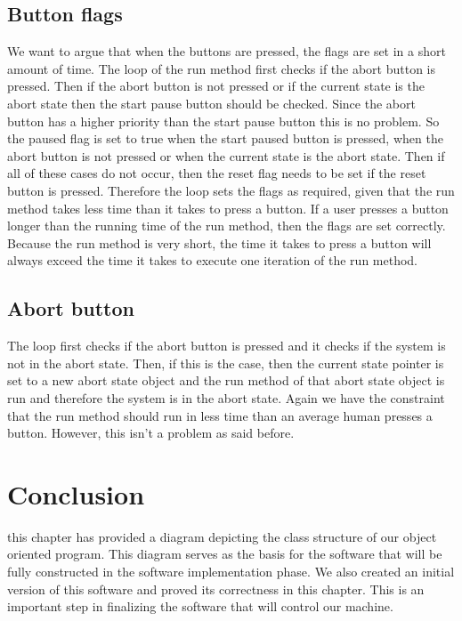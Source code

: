 \documentclass[a4paper,oneside,11pt]{article}
\begin{document}
\subsection{Button flags}
We want to argue that when the buttons are pressed, the flags are set in a short amount of time. The loop of the run method first checks if the abort button is pressed. Then if the abort button is not pressed or if the current state is the abort state then the start pause button should be checked. Since the abort button has a higher priority than the start pause button this is no problem. So the paused flag is set to true when the start paused button is pressed, when the abort button is not pressed or when the current state is the abort state. Then if all of these cases do not occur, then the reset flag needs to be set if the reset button is pressed. Therefore the loop sets the flags as required, given that the run method takes less time than it takes to press a button. If a user presses a button longer than the running time of the run method, then the flags are set correctly. Because the run method is very short, the time it takes to press a button will always exceed the time it takes to execute one iteration of the run method.

\subsection{Abort button}
The loop first checks if the abort button is pressed and it checks if the system is not in the abort state. Then, if this is the case, then the current state pointer is set to a new abort state object and the run method of that abort state object is run and therefore the system is in the abort state. Again we have the constraint that the run method should run in less time than an average human presses a button. However, this isn’t a problem as said before.

\section{Conclusion}
this chapter has provided a diagram depicting the class structure of our object oriented program. This diagram serves as the basis for the software that will be fully constructed in the software implementation phase. We also created an initial version of this software and proved its correctness in this chapter. This is an important step in finalizing the software that will control our machine.
\end{document}
